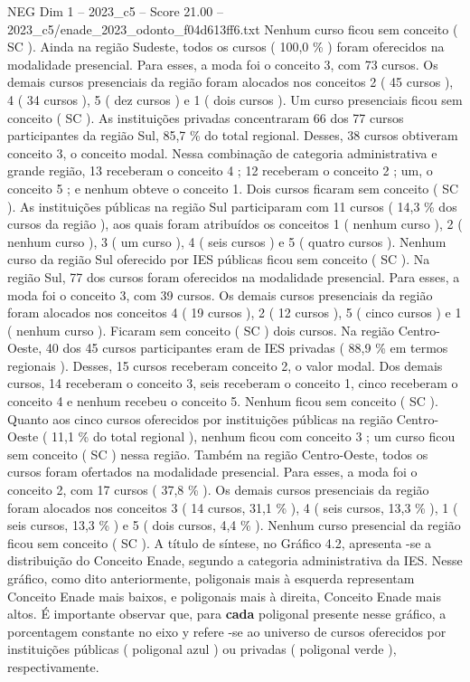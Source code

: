 \begin{textsample}{NEG Dim 1 – 2023\_c5 – Score 21.00 – 2023\_c5/enade\_2023\_odonto\_f04d613ff6.txt}
Nenhum curso ficou sem conceito ( SC ).
Ainda na região Sudeste, todos os cursos ( 100,0 \% ) foram oferecidos na modalidade presencial.
Para esses, a moda foi o conceito 3, com 73 cursos.
Os demais cursos presenciais da região foram alocados nos conceitos 2 ( 45 cursos ), 4 ( 34 cursos ), 5 ( dez cursos ) e 1 ( dois cursos ).
Um curso presenciais ficou sem conceito ( SC ).
As instituições privadas concentraram 66 dos 77 cursos participantes da região Sul, 85,7 \% do total regional.
Desses, 38 cursos obtiveram conceito 3, o conceito modal.
Nessa combinação de categoria administrativa e grande região, 13 receberam o conceito 4 ; 12 receberam o conceito 2 ; um, o conceito 5 ; e nenhum obteve o conceito 1.
Dois cursos ficaram sem conceito ( SC ).
As instituições públicas na região Sul participaram com 11 cursos ( 14,3 \% dos cursos da região ), aos quais foram atribuídos os conceitos 1 ( nenhum curso ), 2 ( nenhum curso ), 3 ( um curso ), 4 ( seis cursos ) e 5 ( quatro cursos ).
Nenhum curso da região Sul oferecido por IES públicas ficou sem conceito ( SC ).
Na região Sul, 77 dos cursos foram oferecidos na modalidade presencial.
Para esses, a moda foi o conceito 3, com 39 cursos.
Os demais cursos presenciais da região foram alocados nos conceitos 4 ( 19 cursos ), 2 ( 12 cursos ), 5 ( cinco cursos ) e 1 ( nenhum curso ).
Ficaram sem conceito ( SC ) dois cursos.
Na região Centro-Oeste, 40 dos 45 cursos participantes eram de IES privadas ( 88,9 \% em termos regionais ).
Desses, 15 cursos receberam conceito 2, o valor modal.
Dos demais cursos, 14 receberam o conceito 3, seis receberam o conceito 1, cinco receberam o conceito 4 e nenhum recebeu o conceito 5.
Nenhum ficou sem conceito ( SC ).
Quanto aos cinco cursos oferecidos por instituições públicas na região Centro-Oeste ( 11,1 \% do total regional ), nenhum ficou com conceito 3 ; um curso ficou sem conceito ( SC ) nessa região.
Também na região Centro-Oeste, todos os cursos foram ofertados na modalidade presencial.
Para esses, a moda foi o conceito 2, com 17 cursos ( 37,8 \% ).
Os demais cursos presenciais da região foram alocados nos conceitos 3 ( 14 cursos, 31,1 \% ), 4 ( seis cursos, 13,3 \% ), 1 ( seis cursos, 13,3 \% ) e 5 ( dois cursos, 4,4 \% ).
Nenhum curso presencial da região ficou sem conceito ( SC ).
A título de síntese, no Gráfico 4.2, apresenta -se a distribuição do Conceito Enade, segundo a categoria administrativa da IES.
Nesse gráfico, como dito anteriormente, poligonais mais à esquerda representam Conceito Enade mais baixos, e poligonais mais à direita, Conceito Enade mais altos.
É importante observar que, para \textbf{cada} poligonal presente nesse gráfico, a porcentagem constante no eixo y refere -se ao universo de cursos oferecidos por instituições públicas ( poligonal azul ) ou privadas ( poligonal verde ), respectivamente.

\end{textsample}
